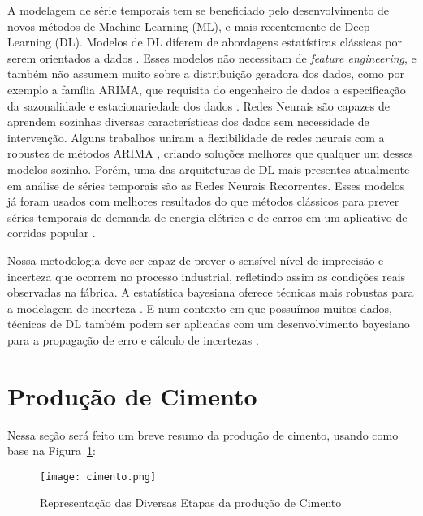 A modelagem de série temporais tem se beneficiado pelo desenvolvimento de novos
métodos de Machine Learning (ML), e mais recentemente de Deep Learning (DL).
Modelos de DL diferem de abordagens estatísticas clássicas por serem orientados
a dados \citep{dlbook}.
Esses modelos não necessitam de \textit{feature engineering}, e também não
assumem muito sobre a distribuição geradora dos dados, como por exemplo a
família ARIMA, que requisita do engenheiro de dados a especificação da
sazonalidade e estacionariedade dos dados \citep{arima}.
Redes Neurais são capazes de aprendem sozinhas diversas características dos dados sem necessidade de intervenção. 
Alguns trabalhos uniram a flexibilidade de redes neurais com a robustez de
métodos ARIMA \citep{DIAZROBLES20088331,KHASHEI2010479},
criando soluções melhores que qualquer um desses modelos sozinho. Porém, uma das
arquiteturas de DL mais presentes atualmente em análise de séries temporais
são as Redes Neurais Recorrentes. Esses modelos já foram usados com
melhores resultados do que métodos clássicos para prever séries temporais de
demanda de energia elétrica e de carros em um aplicativo de corridas popular
\cite{energylstm,ubertime}.


Nossa metodologia deve ser capaz de prever o sensível nível de imprecisão e
incerteza que ocorrem no processo industrial,
refletindo assim as condições reais observadas na fábrica. A estatística bayesiana oferece técnicas
mais robustas para a modelagem de incerteza \cite{bayesml}. E num contexto em
que possuímos muitos dados, técnicas de DL também podem ser aplicadas com um desenvolvimento bayesiano para a propagação de erro e cálculo de incertezas \cite{ubertime,Gal2016Uncertainty}. 



\section{Produção de Cimento}
\label{sec:producao}

Nessa seção será feito um breve resumo da produção de cimento, usando como base na Figura~\ref{fig:cement}: \\ 

\begin{figure}[H]
\label{fig:cement}
\centering
\texttt{[image: cimento.png]}
\caption{Representação das Diversas Etapas da produção de Cimento \citep{cementroadmap}}
\end{figure}


